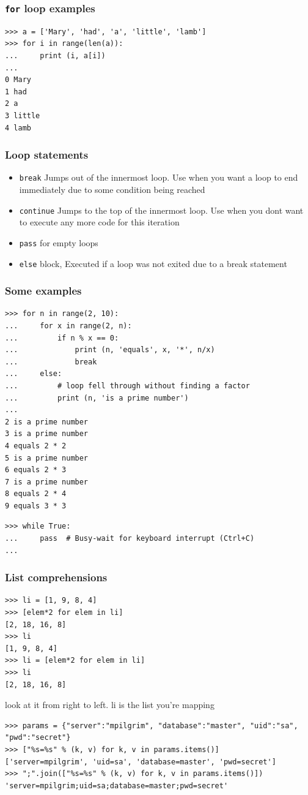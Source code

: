 \documentclass{beamer}
\begin{document}
\begin{frame}[containsverbatim]
\frametitle{\texttt{for} loop examples}
\begin{lstlisting}
>>> a = ['Mary', 'had', 'a', 'little', 'lamb']
>>> for i in range(len(a)):
...     print (i, a[i])
...
0 Mary
1 had
2 a
3 little
4 lamb
\end{lstlisting}
\end{frame}

\begin{frame}
\frametitle{Loop statements}
\begin{itemize}
\item \texttt{break} Jumps out of the innermost loop. Use when you want a loop to end immediately due to some condition being reached
\item \texttt{continue} Jumps to the top of the innermost loop. Use when you dont want to execute any more code for this iteration
\item \texttt{pass} for empty loops
\item \texttt{else} block, Executed if a loop was not exited due to a break statement 
\end{itemize}
\end{frame}

\begin{frame}[containsverbatim]
\frametitle{Some examples}
\begin{lstlisting}
>>> for n in range(2, 10):
...     for x in range(2, n):
...         if n % x == 0:
...             print (n, 'equals', x, '*', n/x)
...             break
...     else:
...         # loop fell through without finding a factor
...         print (n, 'is a prime number')
...
2 is a prime number
3 is a prime number
4 equals 2 * 2
5 is a prime number
6 equals 2 * 3
7 is a prime number
8 equals 2 * 4
9 equals 3 * 3
\end{lstlisting}
\begin{lstlisting}
>>> while True:
...     pass  # Busy-wait for keyboard interrupt (Ctrl+C)
...
\end{lstlisting}
\end{frame}

\begin{frame}[containsverbatim]
\frametitle{List comprehensions}
\begin{lstlisting}
>>> li = [1, 9, 8, 4]
>>> [elem*2 for elem in li]      
[2, 18, 16, 8]
>>> li                           
[1, 9, 8, 4]
>>> li = [elem*2 for elem in li] 
>>> li
[2, 18, 16, 8]
\end{lstlisting}
 look at it from right to left. li is the list you're mapping
\begin{lstlisting}
>>> params = {"server":"mpilgrim", "database":"master", "uid":"sa", "pwd":"secret"}
>>> ["%s=%s" % (k, v) for k, v in params.items()]
['server=mpilgrim', 'uid=sa', 'database=master', 'pwd=secret']
>>> ";".join(["%s=%s" % (k, v) for k, v in params.items()])
'server=mpilgrim;uid=sa;database=master;pwd=secret'
\end{lstlisting}
\end{frame}
\end{document}
